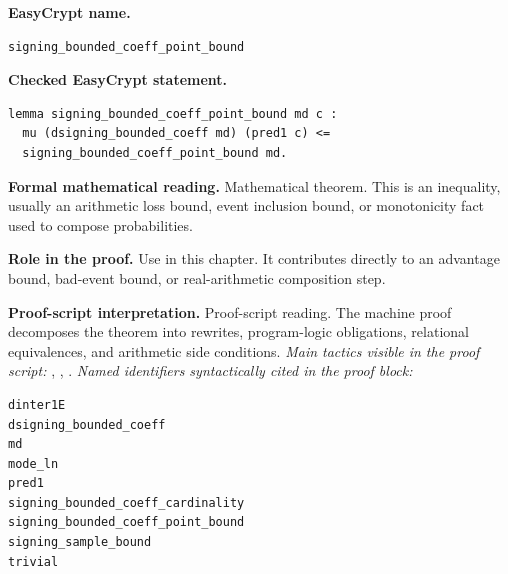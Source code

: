 \begin{formaltheorem}
\noindent\textbf{EasyCrypt name.}
\begin{lstlisting}[language=EasyCrypt,basicstyle=\ttfamily\scriptsize]
signing_bounded_coeff_point_bound
\end{lstlisting}
\noindent\textbf{Checked EasyCrypt statement.}
\begin{lstlisting}[language=EasyCrypt,basicstyle=\ttfamily\scriptsize]
lemma signing_bounded_coeff_point_bound md c :
  mu (dsigning_bounded_coeff md) (pred1 c) <=
  signing_bounded_coeff_point_bound md.
\end{lstlisting}
\noindent\textbf{Formal mathematical reading.}
Mathematical theorem. This is an inequality, usually an arithmetic loss bound, event inclusion bound, or monotonicity fact used to compose probabilities.

\noindent\textbf{Role in the proof.}
Use in this chapter. It contributes directly to an advantage bound, bad-event bound, or real-arithmetic composition step.

\noindent\textbf{Proof-script interpretation.}
Proof-script reading. The machine proof decomposes the theorem into rewrites, program-logic obligations, relational equivalences, and arithmetic side conditions.
\emph{Main tactics visible in the proof script:} , , .
\emph{Named identifiers syntactically cited in the proof block:}
\begin{lstlisting}[language=EasyCrypt,basicstyle=\ttfamily\scriptsize]
dinter1E
dsigning_bounded_coeff
md
mode_ln
pred1
signing_bounded_coeff_cardinality
signing_bounded_coeff_point_bound
signing_sample_bound
trivial
\end{lstlisting}

\end{formaltheorem}

